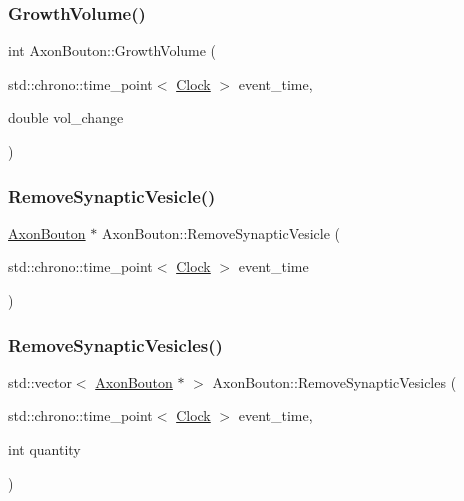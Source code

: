 \mbox{\label{classAxonBouton_a10ac4446e777376a3944c87b2bcf26b5}} 
\subsubsection{\texorpdfstring{Growth\+Volume()}{GrowthVolume()}}
{\footnotesize\ttfamily int Axon\+Bouton\+::\+Growth\+Volume (\begin{DoxyParamCaption}\item[{std\+::chrono\+::time\+\_\+point$<$ \mbox{\hyperlink{universe_8h_a0ef8d951d1ca5ab3cfaf7ab4c7a6fd80}{Clock}} $>$}]{event\+\_\+time,  }\item[{double}]{vol\+\_\+change }\end{DoxyParamCaption})}

\mbox{\label{classAxonBouton_a1f0b13fa7ec408c9e0cfb22cea9bbe8c}} 
\subsubsection{\texorpdfstring{Remove\+Synaptic\+Vesicle()}{RemoveSynapticVesicle()}}
{\footnotesize\ttfamily \mbox{\hyperlink{classAxonBouton}{Axon\+Bouton}} $\ast$ Axon\+Bouton\+::\+Remove\+Synaptic\+Vesicle (\begin{DoxyParamCaption}\item[{std\+::chrono\+::time\+\_\+point$<$ \mbox{\hyperlink{universe_8h_a0ef8d951d1ca5ab3cfaf7ab4c7a6fd80}{Clock}} $>$}]{event\+\_\+time }\end{DoxyParamCaption})}

\mbox{\label{classAxonBouton_ae4119170ef72beaed3c8a0eb1d80ef14}} 
\subsubsection{\texorpdfstring{Remove\+Synaptic\+Vesicles()}{RemoveSynapticVesicles()}}
{\footnotesize\ttfamily std\+::vector$<$ \mbox{\hyperlink{classAxonBouton}{Axon\+Bouton}} $\ast$ $>$ Axon\+Bouton\+::\+Remove\+Synaptic\+Vesicles (\begin{DoxyParamCaption}\item[{std\+::chrono\+::time\+\_\+point$<$ \mbox{\hyperlink{universe_8h_a0ef8d951d1ca5ab3cfaf7ab4c7a6fd80}{Clock}} $>$}]{event\+\_\+time,  }\item[{int}]{quantity }\end{DoxyParamCaption})}

